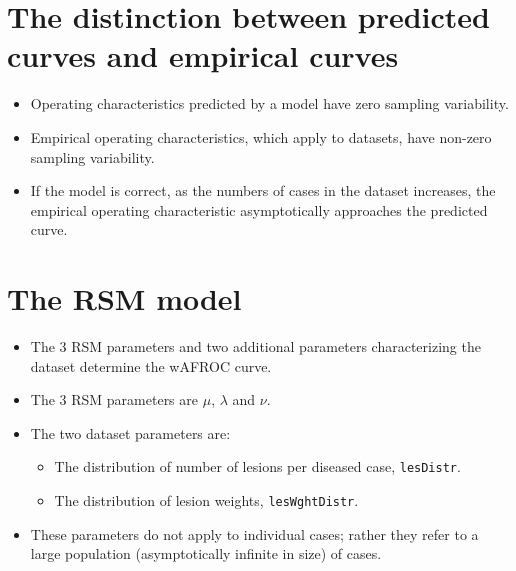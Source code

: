 \documentclass[
]{book}
\newenvironment{Shaded}{\begin{snugshade}}{\end{snugshade}}
\newcommand{\CommentTok}[1]{\textcolor[rgb]{0.56,0.35,0.01}{\textit{#1}}}
\newcommand{\FunctionTok}[1]{\textcolor[rgb]{0.00,0.00,0.00}{#1}}
\newcommand{\NormalTok}[1]{#1}
\newcommand{\SpecialCharTok}[1]{\textcolor[rgb]{0.00,0.00,0.00}{#1}}
\providecommand{\tightlist}{%
  \setlength{\itemsep}{0pt}\setlength{\parskip}{0pt}}
\begin{document}
\hypertarget{the-distinction-between-predicted-curves-and-empirical-curves}{%
\section{The distinction between predicted curves and empirical curves}\label{the-distinction-between-predicted-curves-and-empirical-curves}}

\begin{itemize}
\tightlist
\item
  Operating characteristics predicted by a model have zero sampling variability.\\
\item
  Empirical operating characteristics, which apply to datasets, have non-zero sampling variability.
\item
  If the model is correct, as the numbers of cases in the dataset increases, the empirical operating characteristic asymptotically approaches the predicted curve.
\end{itemize}

\hypertarget{the-rsm-model}{%
\section{The RSM model}\label{the-rsm-model}}

\begin{itemize}
\tightlist
\item
  The 3 RSM parameters and two additional parameters characterizing the dataset determine the wAFROC curve.
\item
  The 3 RSM parameters are \(\mu\), \(\lambda\) and \(\nu\).
\item
  The two dataset parameters are:

  \begin{itemize}
  \tightlist
  \item
    The distribution of number of lesions per diseased case, \texttt{lesDistr}.
  \item
    The distribution of lesion weights, \texttt{lesWghtDistr}.
  \end{itemize}
\item
  These parameters do not apply to individual cases; rather they refer to a large population (asymptotically infinite in size) of cases.
\end{itemize}

\begin{Shaded}
\end{Shaded}
\end{document}
